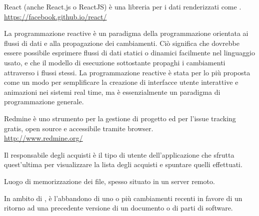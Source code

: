React (anche React.js o ReactJS) è una libreria   per i dati renderizzati come .\\
\url{https://facebook.github.io/react/}

La programmazione reactive è un paradigma della programmazione orientata ai flussi di dati e alla propagazione dei cambiamenti. Ciò significa che dovrebbe essere possibile esprimere flussi di dati statici o dinamici facilmente nel linguaggio usato, e che il modello di esecuzione sottostante propaghi i cambiamenti attraverso i flussi stessi. La programmazione reactive è stata per lo più proposta come un modo per semplificare la creazione di interfacce utente interattive e animazioni nei sistemi real time, ma è essenzialmente un paradigma di programmazione generale.

Redmine è uno strumento per la gestione di progetto ed per l’issue tracking gratis, open source e accessibile tramite browser.\\ 
\url{http://www.redmine.org/}

Il responsabile degli acquisti è il tipo di utente dell’applicazione che sfrutta quest’ultima per visualizzare la lista degli acquisti e spuntare quelli effettuati.

Luogo di memorizzazione dei file, spesso situato in un server remoto.

In ambito di , è l'abbandono di uno o più cambiamenti recenti in favore di un ritorno ad una precedente versione di un documento o di parti di software.
\clearpage